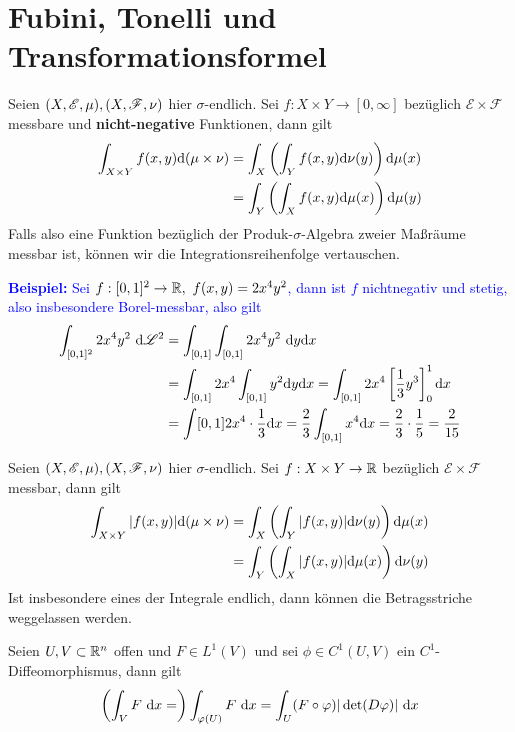\documentclass[a4paper,12pt]{scrartcl}
\begin{document}
    \section{Fubini, Tonelli und Transformationsformel}
    \begin{lemma}[Tonelli] Seien $(X,\mathscr{E},\mu), (X,\mathscr{F},\nu)$ hier $\sigma$-endlich. Sei \(f:X\times Y \to [0,\infty]\) bezüglich $\mathscr{E}\times\mathscr{F}$ messbare und \textbf{nicht-negative}
        Funktionen, dann gilt
        \begin{align*}
            \int_{X\times Y} f(x,y)  \mathrm{d} (\mu \times \nu) &= \int_X\left( \int_Y f(x,y)  \mathrm{d} \nu(y)\right) \mathrm{d} \mu(x) \\ &= \int_Y\left( \int_X f(x,y)  \mathrm{d} \mu(x)\right) \mathrm{d} \mu(y)
        \end{align*}
        Falls also eine Funktion bezüglich der Produk-$\sigma$-Algebra zweier Maßräume messbar ist, können wir die Integrationsreihenfolge vertauschen.
    \end{lemma}
    \textcolor{blue}{\textbf{Beispiel:} Sei $f:[0,1]^2\to \mathbb{R}, \ f(x,y)=2x^4y^2$, dann ist $f$ nichtnegativ und stetig, also insbesondere Borel-messbar, also gilt 
    \begin{align*}
        \int_{[0,1]^2} 2x^4 y^2 \ \mathrm{d} \mathscr{L}^2 &= \int_{[0,1]}\int_{[0,1]} 2x^4 y^2 \ \mathrm{d} y \mathrm{d} x \\
        & = \int_{[0,1]} 2x^4 \int_{[0,1]} y^2 \mathrm{d} y\mathrm{d} x = \int_{[0,1]} 2x^4 \left[\frac{1}{3}y^3\right]_0^1 \mathrm{d} x\\
        &= \int[0,1] 2x^4 \cdot \frac{1}{3} \mathrm{d} x = \frac{2}{3}\int_{[0,1]} x^4 \mathrm{d} x = \frac{2}{3}\cdot \frac{1}{5} = \frac{2}{15}
    \end{align*} }
    \begin{satz}[Fubini] 
        Seien $(X,\mathscr{E},\mu), (X,\mathscr{F},\nu)$ hier $\sigma$-endlich. Sei \(f:X\times Y \to \mathbb{R}\) bezüglich $\mathscr{E}\times\mathscr{F}$ messbar, dann gilt
        \begin{align*}
            \int_{X\times Y} \vert f(x,y)\vert \mathrm{d} (\mu \times \nu) &= \int_X \left(\int_Y \vert f(x,y)\vert \mathrm{d} \nu(y)\right)\mathrm{d} \mu(x) \\ 
             &= \int_Y \left(\int_X \vert f(x,y) \vert \mathrm{d} \mu(x) \right)\mathrm{d} \nu(y) 
        \end{align*}
        Ist insbesondere eines der Integrale endlich, dann können die Betragsstriche weggelassen werden.
    \end{satz}
    \begin{satz}[Transformationsformel] Seien $U,V\subset \mathbb{R}^n$ offen und $F\in L^1(V)$ und sei $\phi\in C^1(U,V)$ ein $C^1$-Diffeomorphismus, dann gilt
        \[
        \left(\int_V F \ \mathrm{d} x =\right)\int_{\varphi(U)} F \ \mathrm{d} x = \int_U (F\circ \varphi) \vert \det (D\varphi)\vert \ \mathrm{d} x    
        \]
        
    \end{satz}
\end{document}
